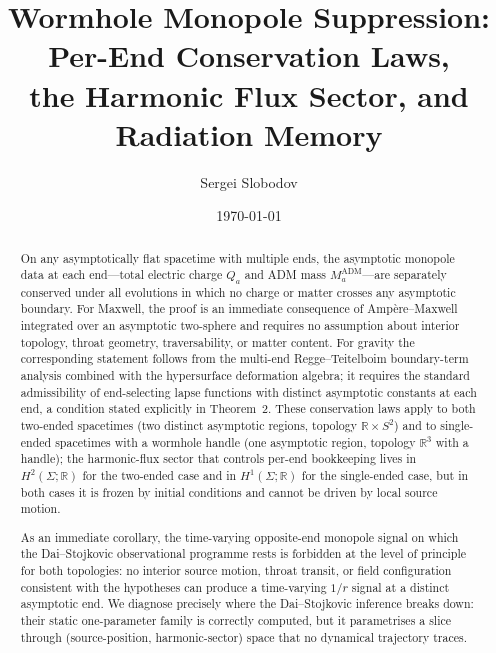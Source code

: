 \documentclass[aps,prd,onecolumn,nofootinbib,superscriptaddress]{revtex4-2}
\begin{document}
\title{Wormhole Monopole Suppression: Per-End Conservation Laws,\\
the Harmonic Flux Sector, and Radiation Memory}

\author{Sergei Slobodov}

\date{\today}

\begin{abstract}
On any asymptotically flat spacetime with multiple ends, the asymptotic monopole
data at each end---total electric charge $Q_a$ and ADM mass $M_a^{\mathrm{ADM}}$---are
separately conserved under all evolutions in which no charge or matter crosses
any asymptotic boundary.  For Maxwell, the proof is an immediate consequence of
Amp\`ere--Maxwell integrated over an asymptotic two-sphere and requires no
assumption about interior topology, throat geometry, traversability, or matter
content.  For gravity the corresponding statement follows from the multi-end
Regge--Teitelboim boundary-term analysis combined with the hypersurface
deformation algebra; it requires the standard admissibility of end-selecting
lapse functions with distinct asymptotic constants at each end, a condition
stated explicitly in Theorem~2.  These conservation laws apply to both
two-ended spacetimes (two distinct asymptotic regions, topology $\mathbb{R}\times
S^2$) and to single-ended spacetimes with a wormhole handle (one asymptotic
region, topology $\mathbb{R}^3$ with a handle); the harmonic-flux sector that
controls per-end bookkeeping lives in $H^2(\Sigma;\mathbb{R})$ for the
two-ended case and in $H^1(\Sigma;\mathbb{R})$ for the single-ended case, but
in both cases it is frozen by initial conditions and cannot be driven by local
source motion.

As an immediate corollary, the time-varying opposite-end monopole signal on
which the Dai--Stojkovic observational programme rests is forbidden at the
level of principle for both topologies: no interior source motion, throat
transit, or field configuration consistent with the hypotheses can produce a
time-varying $1/r$ signal at a distinct asymptotic end.  We diagnose precisely
where the Dai--Stojkovic inference breaks down: their static one-parameter
family is correctly computed, but it parametrises a slice through
(source-position, harmonic-sector) space that no dynamical trajectory traces.


\end{abstract}
\end{document}
